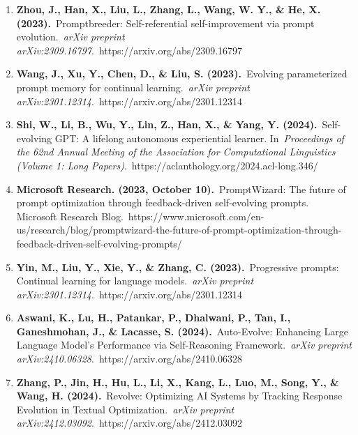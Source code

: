 \documentclass[10pt,a4paper,twocolumn]{article}
\begin{document}






\begin{enumerate}
    \item 
\textbf{Zhou, J., Han, X., Liu, L., Zhang, L., Wang, W. Y., \& He, X. (2023).} Promptbreeder: Self-referential self-improvement via prompt evolution. \textit{arXiv preprint arXiv:2309.16797}. https://arxiv.org/abs/2309.16797

  \item 
\textbf{Wang, J., Xu, Y., Chen, D., \& Liu, S. (2023).} Evolving parameterized prompt memory for continual learning. \textit{arXiv preprint arXiv:2301.12314}. https://arxiv.org/abs/2301.12314

   \item 
\textbf{Shi, W., Li, B., Wu, Y., Lin, Z., Han, X., \& Yang, Y. (2024).} Self-evolving GPT: A lifelong autonomous experiential learner. In \textit{Proceedings of the 62nd Annual Meeting of the Association for Computational Linguistics (Volume 1: Long Papers)}. https://aclanthology.org/2024.acl-long.346/

  \item 
\textbf{Microsoft Research. (2023, October 10).} PromptWizard: The future of prompt optimization through feedback-driven self-evolving prompts. Microsoft Research Blog. https://www.microsoft.com/en-us/research/blog/promptwizard-the-future-of-prompt-optimization-through-feedback-driven-self-evolving-prompts/

   \item 
\textbf{Yin, M., Liu, Y., Xie, Y., \& Zhang, C. (2023).} Progressive prompts: Continual learning for language models. \textit{arXiv preprint arXiv:2301.12314}. https://arxiv.org/abs/2301.12314

  \item 
\textbf{Aswani, K., Lu, H., Patankar, P., Dhalwani, P., Tan, I., Ganeshmohan, J., \& Lacasse, S. (2024).} Auto-Evolve: Enhancing Large Language Model's Performance via Self-Reasoning Framework. \textit{arXiv preprint arXiv:2410.06328}. https://arxiv.org/abs/2410.06328

   \item 
\textbf{Zhang, P., Jin, H., Hu, L., Li, X., Kang, L., Luo, M., Song, Y., \& Wang, H. (2024).} Revolve: Optimizing AI Systems by Tracking Response Evolution in Textual Optimization. \textit{arXiv preprint arXiv:2412.03092}. https://arxiv.org/abs/2412.03092


\end{enumerate}
\end{document}
